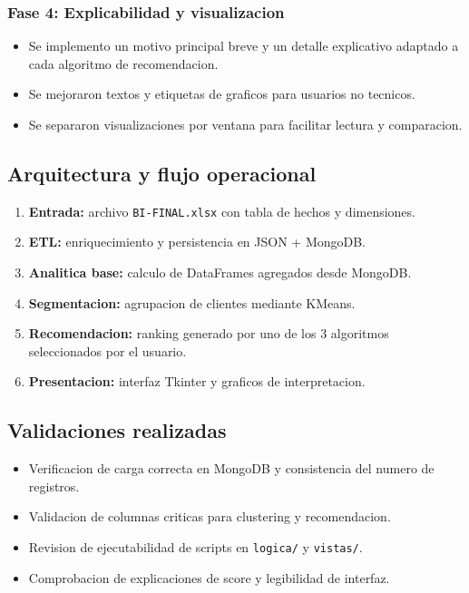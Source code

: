﻿\documentclass{article}
\begin{document}
\subsubsection{Fase 4: Explicabilidad y visualizacion}
\begin{itemize}
    \item Se implemento un motivo principal breve y un detalle explicativo adaptado a cada algoritmo de recomendacion.
    \item Se mejoraron textos y etiquetas de graficos para usuarios no tecnicos.
    \item Se separaron visualizaciones por ventana para facilitar lectura y comparacion.
\end{itemize}

\subsection{Arquitectura y flujo operacional}
\begin{enumerate}
    \item \textbf{Entrada:} archivo \texttt{BI-FINAL.xlsx} con tabla de hechos y dimensiones.
    \item \textbf{ETL:} enriquecimiento y persistencia en JSON + MongoDB.
    \item \textbf{Analitica base:} calculo de DataFrames agregados desde MongoDB.
    \item \textbf{Segmentacion:} agrupacion de clientes mediante KMeans.
    \item \textbf{Recomendacion:} ranking generado por uno de los 3 algoritmos seleccionados por el usuario.
    \item \textbf{Presentacion:} interfaz Tkinter y graficos de interpretacion.
\end{enumerate}

\subsection{Validaciones realizadas}
\begin{itemize}
    \item Verificacion de carga correcta en MongoDB y consistencia del numero de registros.
    \item Validacion de columnas criticas para clustering y recomendacion.
    \item Revision de ejecutabilidad de scripts en \texttt{logica/} y \texttt{vistas/}.
    \item Comprobacion de explicaciones de score y legibilidad de interfaz.
\end{itemize}
\end{document}
